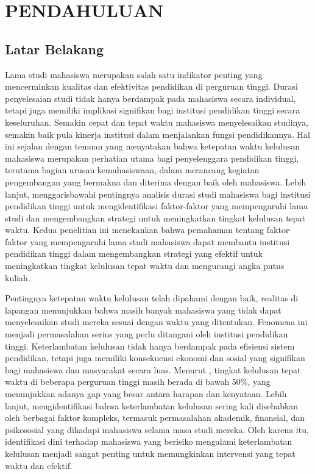 \chapter{PENDAHULUAN}

\section{Latar Belakang}
Lama studi mahasiswa merupakan salah satu indikator penting yang mencerminkan kualitas dan efektivitas pendidikan di perguruan tinggi. Durasi penyelesaian studi tidak hanya berdampak pada mahasiswa secara individual, tetapi juga memiliki implikasi signifikan bagi institusi pendidikan tinggi secara keseluruhan. Semakin cepat dan tepat waktu mahasiswa menyelesaikan studinya, semakin baik pula kinerja institusi dalam menjalankan fungsi pendidikannya. Hal ini sejalan dengan temuan \cite{so2020developing} yang menyatakan bahwa ketepatan waktu kelulusan mahasiswa merupakan perhatian utama bagi penyelenggara pendidikan tinggi, terutama bagian urusan kemahasiswaan, dalam merancang kegiatan pengembangan yang bermakna dan diterima dengan baik oleh mahasiswa. Lebih lanjut, \cite{chen2019analysis} menggarisbawahi pentingnya analisis durasi studi mahasiswa bagi institusi pendidikan tinggi untuk mengidentifikasi faktor-faktor yang mempengaruhi lama studi dan mengembangkan strategi untuk meningkatkan tingkat kelulusan tepat waktu. Kedua penelitian ini menekankan bahwa pemahaman tentang faktor-faktor yang mempengaruhi lama studi mahasiswa dapat membantu institusi pendidikan tinggi dalam mengembangkan strategi yang efektif untuk meningkatkan tingkat kelulusan tepat waktu dan mengurangi angka putus kuliah.

Pentingnya ketepatan waktu kelulusan telah dipahami dengan baik, realitas di lapangan menunjukkan bahwa masih banyak mahasiswa yang tidak dapat menyelesaikan studi mereka sesuai dengan waktu yang ditentukan. Fenomena ini menjadi permasalahan serius yang perlu ditangani oleh institusi pendidikan tinggi. Keterlambatan kelulusan tidak hanya berdampak pada efisiensi sistem pendidikan, tetapi juga memiliki konsekuensi ekonomi dan sosial yang signifikan bagi mahasiswa dan masyarakat secara luas. Menurut \cite{putri2018analysis}, tingkat kelulusan tepat waktu di beberapa perguruan tinggi masih berada di bawah 50\%, yang menunjukkan adanya gap yang besar antara harapan dan kenyataan. Lebih lanjut, \cite{wang2018design} mengidentifikasi bahwa keterlambatan kelulusan sering kali disebabkan oleh berbagai faktor kompleks, termasuk permasalahan akademik, finansial, dan psikososial yang dihadapi mahasiswa selama masa studi mereka. Oleh karena itu, identifikasi dini terhadap mahasiswa yang berisiko mengalami keterlambatan kelulusan menjadi sangat penting untuk memungkinkan intervensi yang tepat waktu dan efektif.

